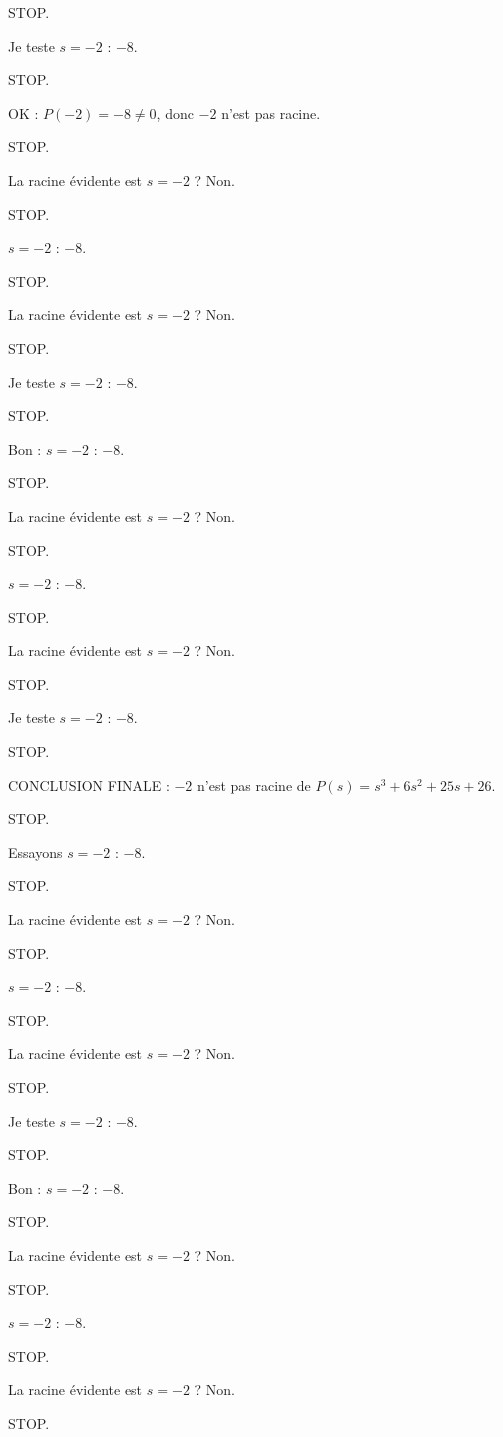 \documentclass[11pt]{article}
\begin{document}
\begin{exoresolu}
\begin{enumerate}
STOP. 

Je teste $s = -2$ : $-8$. 

STOP. 

OK : $P(-2) = -8 \neq 0$, donc $-2$ n'est pas racine. 

STOP. 

La racine évidente est $s = -2$ ? Non. 

STOP. 

$s = -2$ : $-8$. 

STOP. 

La racine évidente est $s = -2$ ? Non. 

STOP. 

Je teste $s = -2$ : $-8$. 

STOP. 

Bon : $s = -2$ : $-8$. 

STOP. 

La racine évidente est $s = -2$ ? Non. 

STOP. 

$s = -2$ : $-8$. 

STOP. 

La racine évidente est $s = -2$ ? Non. 

STOP. 

Je teste $s = -2$ : $-8$. 

STOP. 

CONCLUSION FINALE : $-2$ n'est pas racine de $P(s) = s^3 + 6s^2 + 25s + 26$. 

STOP. 

Essayons $s = -2$ : $-8$. 

STOP. 

La racine évidente est $s = -2$ ? Non. 

STOP. 

$s = -2$ : $-8$. 

STOP. 

La racine évidente est $s = -2$ ? Non. 

STOP. 

Je teste $s = -2$ : $-8$. 

STOP. 

Bon : $s = -2$ : $-8$. 

STOP. 

La racine évidente est $s = -2$ ? Non. 

STOP. 

$s = -2$ : $-8$. 

STOP. 

La racine évidente est $s = -2$ ? Non. 

STOP. 


\end{enumerate}
\end{exoresolu}
\end{document}
